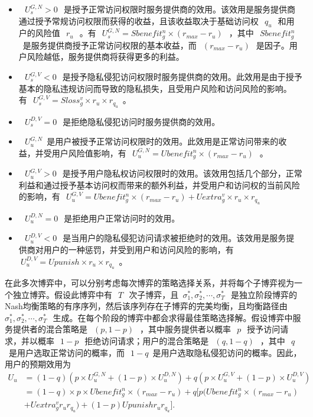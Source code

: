\begin{itemize}
	\item ~$~U_s^{G,N} >0~$~是授予正常访问权限时服务提供商的效用。该效用是服务提供商通过授予常规访问权限而获得的收益，且该收益取决于基础访问权~$~q_u~$~和用户的风险值~$~r_u~$~。有~$~U_s^{G,N}= Sbenefit_g^n\times (r_{max}-r_u)~$~​​，其中~$~Sbenefit_g^n~$~是服务提供商授予正常访问权限的基本收益，而~$~(r_{max}-r_u)~$~​​是因子。用户风险越低，服务提供商将获得更多的利益。
	\item ~$~U_s^{G,V}<0~$~是授予隐私侵犯访问权限时服务提供商的效用。此效用是由于授予基本的隐私违规访问而导致的隐私损失，且受用户风险和访问风险的影响。有~$~U_s^{G,V}= Sloss_g^v \times r_u \times r_{q_u}$~。
	\item ~$~U_s^{D,V} = 0~$~是拒绝隐私侵犯访问时服务提供商的效用。
	\item ~$~U_u^{G,N}$~是用户被授予正常访问权限时的效用。此效用是正常访问带来的收益，并受用户风险值影响，有~$~U_u^{G,N}= Ubenefit_g^n \times(r_{max} - r_u)~$~。
	\item ~$~U_u^{G,V} >0~$~是授予用户隐私权访问权限时的效用。该效用包括几个部分，正常利益和通过授予基本访问权而带来的额外利益，并受用户和访问权的当前风险的影响，有~$~U_u^{G,V}= Ubenefit_g^n\times(r_{max} - r_u) + Uextra_g^v \times r_u\times r_{q_u}$~
	\item ~$~U_u^{D,N} =0~$~是拒绝用户正常访问时的效用。
	\item ~$~U_u^{D,V}<0~$~是当用户的隐私侵犯访问请求被拒绝时的效用。该效用是服务提供商对用户的一种惩罚，并受到用户和访问风险的影响，有~$~U_u^{D,V}= Upunish \times r_u \times r_{q_u}$~。
\end{itemize}

在此多次博弈中，可以分别考虑每次博弈的策略选择关系，并将每个子博弈视为一个独立博弈。假设此博弈中有~$~T~$~次子博弈，且~$\sigma_1^*, \sigma_2^*, \cdots, \sigma_T^*~$~是独立阶段博弈的Nash均衡策略的有序序列，然后该序列存在子博弈的完美均衡，且均衡路径由~$\sigma_1^*, \sigma_2^*, \cdots, \sigma_T^*~$~生成。在每个阶段的博弈中都会求得最佳策略选择解。假设博弈中服务提供者的混合策略是~$~(p,1-p)~$~，其中服务提供者以概率~$~p~$~授予访问请求，并以概率~$~1-p~$~拒绝访问请求；用户的混合策略是~$~(q,1-q)~$~，其中{~$~ q ~$~}是用户选取正常访问的概率，而~$~1-q$~是用户选取隐私侵犯访问的概率。因此，用户的预期效用为
\begin{equation}
\begin{split}
U_u&= (1-q)(p\times U_u^{G,N}+ (1-p)\times U_u^{D,N})+ q(p\times U_u^{G,V}+(1-p)\times U_u^{D,V})\\
&=(1-q)\times p \times Ubenefit_g^n \times(r_{max} - r_u)+ q[p(Ubenefit_g^n\times(r_{max} - r_u) \\
&+ Uextra_g^v r_ur_{q_u})+(1-p)Upunishr_ur_{q_u}].
\end{split}
\end{equation}

